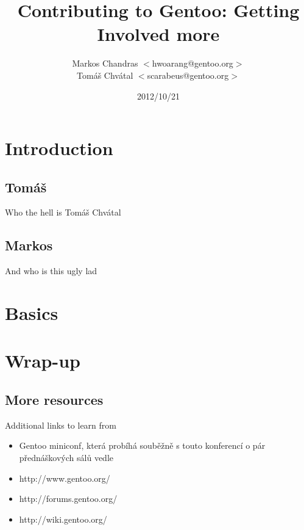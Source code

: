 \documentclass{beamer}
\title{Contributing to Gentoo: Getting Involved more}
\author[Markos Chandras \& Tomáš Chvátal]{Markos Chandras $<$hwoarang@gentoo.org$>$ \\ Tomáš Chvátal $<$scarabeus@gentoo.org$>$}
\date{2012/10/21}
\begin{document}
\frame{\titlepage}
\section{Introduction}

\subsection{Tomáš}
\begin{frame}{Who the hell is Tomáš Chvátal}
\end{frame}

\subsection{Markos}
\begin{frame}{And who is this ugly lad}
\end{frame}
\section{Basics}

\section{Wrap-up}

\subsection{More resources}
\begin{frame}{Additional links to learn from}
	\begin{itemize}
		\item Gentoo miniconf, která probíhá souběžně s touto konferencí o pár přednáškových sálů vedle
		\item http://www.gentoo.org/
		\item http://forums.gentoo.org/
		\item http://wiki.gentoo.org/
	\end{itemize}
\end{frame}
\end{document}
